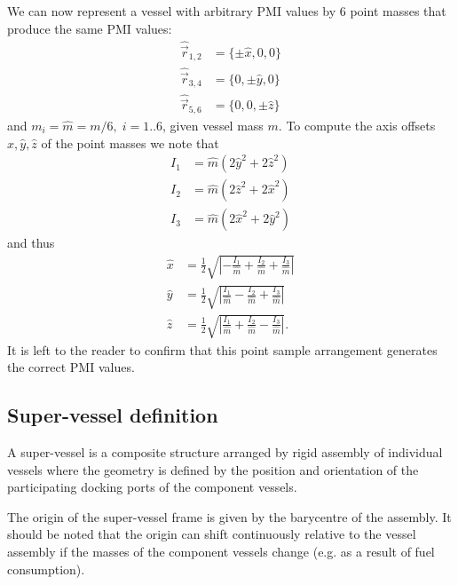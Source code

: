 \documentclass[a4paper]{article}
\begin{document}
We can now represent a vessel with arbitrary PMI values by 6 point masses that produce the same PMI values:
\begin{equation}
\begin{split}
  \hat{\vec{r}}_{1,2} &= \lbrace \pm \hat x, 0, 0 \rbrace \\
  \hat{\vec{r}}_{3,4} &= \lbrace 0, \pm \hat y, 0 \rbrace \\
  \hat{\vec{r}}_{5,6} &= \lbrace 0, 0, \pm \hat z \rbrace
\end{split}
\end{equation}
and $m_i = \hat m = m/6,\; i=1..6$, given vessel mass $m$.
To compute the axis offsets $\hat x, \hat y, \hat z$ of the point masses we note that
\begin{equation}
\begin{split}
  I_1 &= \hat m (2 \hat y^2 + 2 \hat z^2) \\
  I_2 &= \hat m (2 \hat z^2 + 2 \hat x^2) \\
  I_3 &= \hat m (2 \hat x^2 + 2 \hat y^2)
\end{split}
\end{equation}
and thus
\begin{equation}\label{eq:smp_ofs}
\begin{split}
\hat x &= \frac{1}{2} \sqrt{\left| -\frac{I_1}{\hat m} + \frac{I_2}{\hat m} + \frac{I_3}{\hat m} \right|} \\
\hat y &= \frac{1}{2} \sqrt{\left| \frac{I_1}{\hat m} - \frac{I_2}{\hat m} + \frac{I_3}{\hat m} \right|} \\
\hat z &= \frac{1}{2} \sqrt{\left| \frac{I_1}{\hat m} + \frac{I_2}{\hat m} - \frac{I_3}{\hat m} \right|}.
\end{split}
\end{equation}
It is left to the reader to confirm that this point sample arrangement generates the correct PMI values.

\subsection{Super-vessel definition}
A super-vessel is a composite structure arranged by rigid assembly of individual vessels where the geometry is defined by the position and orientation of the participating docking ports of the component vessels.

The origin of the super-vessel frame is given by the barycentre of the assembly. It should be noted that the origin can shift continuously relative to the vessel assembly if the masses of the component vessels change (e.g. as a result of fuel consumption).
\end{document}
